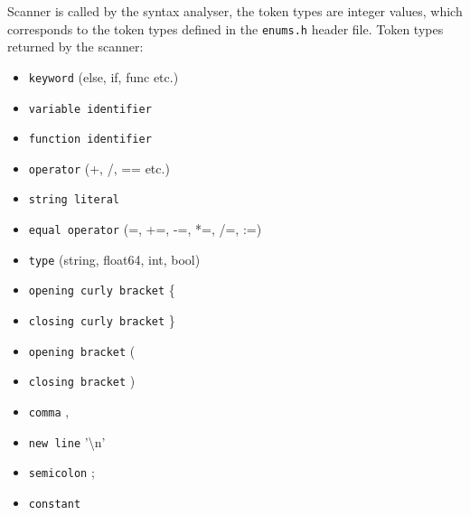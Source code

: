 \documentclass[12pt]{article}
\begin{document}
	Scanner is called by the syntax analyser, the token types are integer values, which corresponds to the token types defined in the \texttt{enums.h} header file.
	Token types returned by the scanner:
\label{sec:retsymbols}
	\begin{itemize}
 		\item \texttt{keyword} (else, if, func etc.)
		\item \texttt{variable identifier}
   		\item \texttt{function identifier}
		\item \texttt{operator} (+, /, == etc.) 
		\item \texttt{string literal} 
		\item \texttt{equal operator} (=, +=, -=, *=, /=, :=)
		\item \texttt{type} (string, float64, int, bool)
		\item \texttt{opening curly bracket} \{
		\item \texttt{closing curly bracket} \}
		\item \texttt{opening bracket} (
		\item \texttt{closing bracket} )
		\item \texttt{comma} ,
		\item \texttt{new line} '\textbackslash n'
		\item \texttt{semicolon} ;
		\item \texttt{constant}
	\end{itemize} 	
\end{document}
